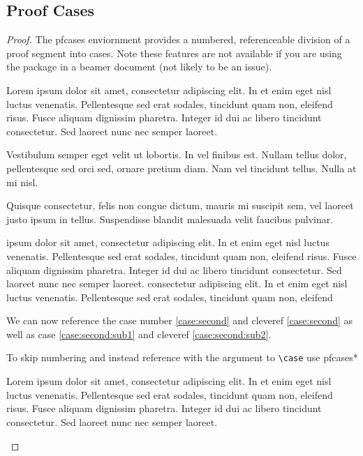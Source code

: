 \documentclass[leqno,11pt]{amsart}
\begin{document}
\subsection{Proof Cases}

\begin{proof}
The pfcases enviornment provides a numbered, referenceable division of a proof segment into cases.  Note these features are not available if you are using the package in a beamer document (not likely to be an issue).

\begin{pfcases}
\case[\( x = y \)]\label{case:first} %
	Lorem ipsum dolor sit amet, consectetur adipiscing elit. In et enim eget nisl luctus venenatis. Pellentesque sed erat sodales, tincidunt quam non, eleifend risus. Fusce aliquam dignissim pharetra. Integer id dui ac libero tincidunt consectetur. Sed laoreet nunc nec semper laoreet. 

	Vestibulum semper eget velit ut lobortis. In vel finibus est. Nullam tellus dolor, pellentesque sed orci sed, ornare pretium diam. Nam vel tincidunt tellus. Nulla at mi nisl. 

\case[\( x = z \land z > q \land z < r \land x + z = r \)] \label{case:second} %
	Quisque consectetur, felis non congue dictum, mauris mi suscipit sem, vel laoreet justo ipsum in tellus. Suspendisse blandit malesuada velit faucibus pulvinar. 

\begin{pfcases}
\case[\( x=2 \)] \label{case:second:sub1} %
	ipsum dolor sit amet, consectetur adipiscing elit. In et enim eget nisl luctus venenatis. Pellentesque sed erat sodales, tincidunt quam non, eleifend risus. Fusce aliquam dignissim pharetra. Integer id dui ac libero tincidunt consectetur. Sed laoreet nunc nec semper laoreet. 
\case[\( x = 3 \)] \label{case:second:sub2} %
	consectetur adipiscing elit. In et enim eget nisl luctus venenatis. Pellentesque sed erat sodales, tincidunt quam non, eleifend 
\end{pfcases}

\end{pfcases}

We can now reference the case number \ref{case:second} and cleveref \cref{case:second} as well as case \ref{case:second:sub1} and cleveref \cref{case:second:sub2}.


To skip numbering and instead reference with the argument to \verb=\case= use pfcases*
\begin{pfcases*}
\case[\( x = y \)]\label{case*:first}  Lorem ipsum dolor sit amet, consectetur adipiscing elit. In et enim eget nisl luctus venenatis. Pellentesque sed erat sodales, tincidunt quam non, eleifend risus. Fusce aliquam dignissim pharetra. Integer id dui ac libero tincidunt consectetur. Sed laoreet nunc nec semper laoreet. 


\end{pfcases*}
\end{proof}
\end{document}

